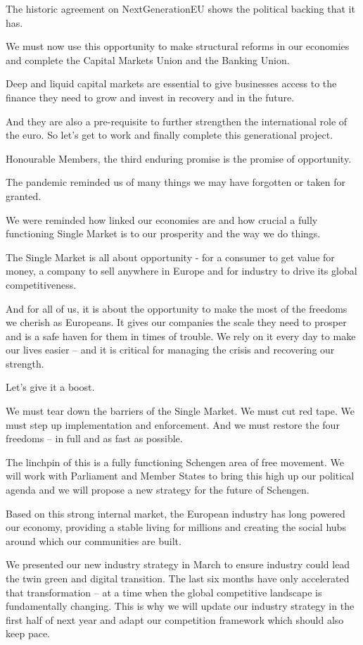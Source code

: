 \documentclass[a4paper,11pt]{article}
\begin{document}
The historic agreement on NextGenerationEU shows the political backing that it has.

We must now use this opportunity to make structural reforms in our economies and complete the Capital Markets Union and the Banking Union.

Deep and liquid capital markets are essential to give businesses access to the finance they need to grow and invest in recovery and in the future.

And they are also a pre-requisite to further strengthen the international role of the euro. So let's get to work and finally complete this generational project.

 

Honourable Members, the third enduring promise is the promise of opportunity.

The pandemic reminded us of many things we may have forgotten or taken for granted.

We were reminded how linked our economies are and how crucial a fully functioning Single Market is to our prosperity and the way we do things.

The Single Market is all about opportunity - for a consumer to get value for money, a company to sell anywhere in Europe and for industry to drive its global competitiveness.

And for all of us, it is about the opportunity to make the most of the freedoms we cherish as Europeans. It gives our companies the scale they need to prosper and is a safe haven for them in times of trouble. We rely on it every day to make our lives easier – and it is critical for managing the crisis and recovering our strength.

Let's give it a boost.

We must tear down the barriers of the Single Market. We must cut red tape. We must step up implementation and enforcement. And we must restore the four freedoms – in full and as fast as possible.

The linchpin of this is a fully functioning Schengen area of free movement. We will work with Parliament and Member States to bring this high up our political agenda and we will propose a new strategy for the future of Schengen.

Based on this strong internal market, the European industry has long powered our economy, providing a stable living for millions and creating the social hubs around which our communities are built.

We presented our new industry strategy in March to ensure industry could lead the twin green and digital transition. The last six months have only accelerated that transformation – at a time when the global competitive landscape is fundamentally changing. This is why we will update our industry strategy in the first half of next year and adapt our competition framework which should also keep pace.
\end{document}

